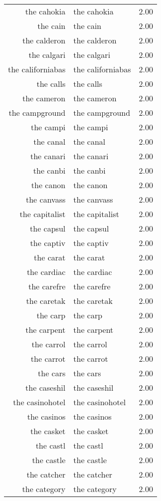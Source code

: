 \begin{table}[ht]
\begin{tabular}{rlr}
  the cahokia & the cahokia & 2.00 \\ 
  the cain & the cain & 2.00 \\ 
  the calderon & the calderon & 2.00 \\ 
  the calgari & the calgari & 2.00 \\ 
  the californiabas & the californiabas & 2.00 \\ 
  the calls & the calls & 2.00 \\ 
  the cameron & the cameron & 2.00 \\ 
  the campground & the campground & 2.00 \\ 
  the campi & the campi & 2.00 \\ 
  the canal & the canal & 2.00 \\ 
  the canari & the canari & 2.00 \\ 
  the canbi & the canbi & 2.00 \\ 
  the canon & the canon & 2.00 \\ 
  the canvass & the canvass & 2.00 \\ 
  the capitalist & the capitalist & 2.00 \\ 
  the capsul & the capsul & 2.00 \\ 
  the captiv & the captiv & 2.00 \\ 
  the carat & the carat & 2.00 \\ 
  the cardiac & the cardiac & 2.00 \\ 
  the carefre & the carefre & 2.00 \\ 
  the caretak & the caretak & 2.00 \\ 
  the carp & the carp & 2.00 \\ 
  the carpent & the carpent & 2.00 \\ 
  the carrol & the carrol & 2.00 \\ 
  the carrot & the carrot & 2.00 \\ 
  the cars & the cars & 2.00 \\ 
  the caseshil & the caseshil & 2.00 \\ 
  the casinohotel & the casinohotel & 2.00 \\ 
  the casinos & the casinos & 2.00 \\ 
  the casket & the casket & 2.00 \\ 
  the castl & the castl & 2.00 \\ 
  the castle & the castle & 2.00 \\ 
  the catcher & the catcher & 2.00 \\ 
  the category & the category & 2.00 \\ 

\end{tabular}
\end{table}
